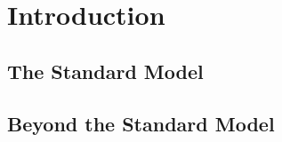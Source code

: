 \chapter{Introduction}
\label{intro}

\section{The Standard Model}
\section{Beyond the Standard Model}
